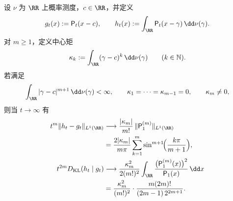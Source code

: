 \begin{theorem}\label{thm:xi-poisson-first-nonvanishing-moment-tv-kl-sharp}
设 \(\nu\) 为 \(\RR\) 上概率测度，\(c\in\RR\)，并定义
\[
g_t(x):=\mathsf P_t(x-c),\qquad
h_t(x):=\int_{\RR}\mathsf P_t(x-\gamma)\,\dd\nu(\gamma).
\]
对 \(m\ge 1\)，定义中心矩
\[
\kappa_k:=\int_{\RR}(\gamma-c)^k\,\dd\nu(\gamma)\qquad(k\in\mathbb N).
\]
若满足
\[
\int_{\RR}|\gamma-c|^{m+1}\,\dd\nu(\gamma)<\infty,\qquad
\kappa_1=\cdots=\kappa_{m-1}=0,\qquad
\kappa_m\neq 0,
\]
则当 \(t\to\infty\) 有
\begin{align}
t^m\|h_t-g_t\|_{L^1(\RR)}
&\longrightarrow
\frac{|\kappa_m|}{m!}\,\|\mathsf P_1^{(m)}\|_{L^1(\RR)}\notag\\
&=
\frac{2|\kappa_m|}{m\pi}
\sum_{k=1}^{m}\sin^{m+1}\!\Bigl(\frac{k\pi}{m+1}\Bigr),\label{eq:xi-poisson-first-nonvanishing-moment-tv-sharp}\\
t^{2m}D_{\mathrm{KL}}(h_t\mid g_t)
&\longrightarrow
\frac{\kappa_m^2}{2(m!)^2}
\int_{\RR}\frac{\bigl(\mathsf P_1^{(m)}(x)\bigr)^2}{\mathsf P_1(x)}\,\dd x\notag\\
&=
\frac{\kappa_m^2}{(m!)^2}\cdot
\frac{m(2m)!}{(2m-1)\,2^{2m+1}}.\label{eq:xi-poisson-first-nonvanishing-moment-kl-sharp}
\end{align}
\end{theorem}
